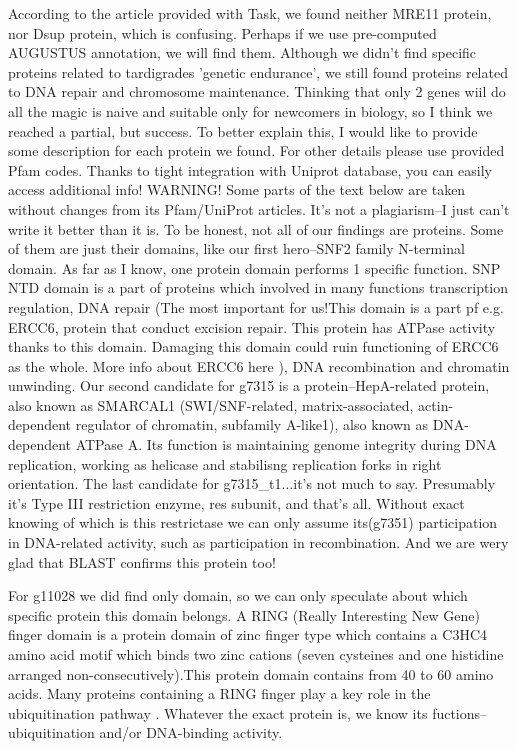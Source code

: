 \documentclass{article}
\begin{document}
 According to the article provided with Task, we found neither MRE11 protein, nor Dsup protein, which is confusing. Perhaps if we use pre-computed AUGUSTUS annotation, we will find them. Although we didn't find specific proteins related to tardigrades 'genetic endurance', we still found proteins related to DNA repair and chromosome maintenance. Thinking that only 2 genes wiil do all the magic is naive and suitable only for newcomers in biology, so I think we reached a partial, but success. To better explain this, I would like to provide some description for each protein we found. For other details please use provided Pfam codes. Thanks to tight integration with Uniprot database, you can easily access additional info! WARNING! Some parts of the text below are taken without changes from its Pfam/UniProt articles. It's not a plagiarism--I just can't write it better than it is. 
 To be honest, not all of our findings are proteins. Some of them are just their domains, like our first hero--SNF2 family N-terminal domain. As far as I know, one protein domain performs 1 specific function. SNP NTD domain is a part of proteins which involved in many functions transcription regulation, DNA repair (The most important for us!This domain is a part pf e.g. ERCC6, protein that conduct excision repair. This protein has ATPase activity thanks to this domain. Damaging this domain could ruin functioning of ERCC6 as the whole. More info about ERCC6 here \cite{5}), DNA recombination and chromatin unwinding.
 Our second candidate for g7315 is a protein--HepA-related protein, also known as SMARCAL1 (SWI/SNF-related, matrix-associated, actin-dependent regulator of chromatin, subfamily A-like1), also known as DNA-dependent ATPase A. Its function is maintaining genome integrity during DNA replication, working as helicase and stabilisng replication forks in right orientation. The last candidate for g7315_t1...it's not much to say. Presumably it's Type III restriction enzyme, res subunit, and that's all. Without exact knowing of which is this restrictase we can only assume its(g7351) participation in DNA-related activity, such as participation in recombination. And we are wery glad that BLAST confirms this protein too!
 
 For g11028 we did find only domain, so we can only speculate about which specific protein this domain belongs. A RING (Really Interesting New Gene) finger domain is a protein domain of zinc finger type which contains a C3HC4 amino acid motif which binds two zinc cations (seven cysteines and one histidine arranged non-consecutively).This protein domain contains from 40 to 60 amino acids. Many proteins containing a RING finger play a key role in the ubiquitination pathway \cite{6}. Whatever the exact protein is, we know its fuctions--ubiquitination and/or DNA-binding activity.
 
\end{document}
